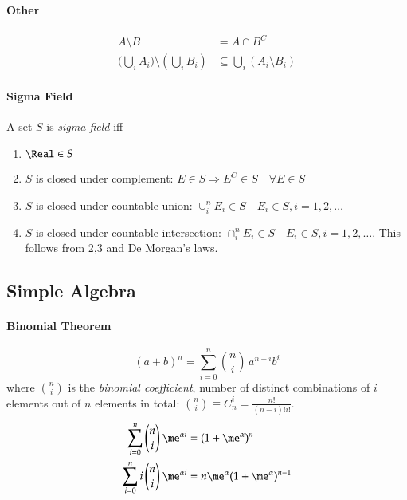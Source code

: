 \documentclass[a4paper]{article}
\numberwithin{equation}{subsection}
\begin{document}
\paragraph{Other}

\begin{align}
  A \setminus B &= A \cap B^C  
\\
  \big(\bigcup_{i} A_{i}\big) \setminus (\bigcup_{i} B_{i}) &\subseteq
                                          \bigcup_{i} (A_{i} \setminus B_{i})
\end{align}

\paragraph{Sigma Field}

A set $S$ is \emph{sigma field} iff
\begin{enumerate}
\item $\Real \in S$
\item $S$ is closed under complement: $E \in S \Rightarrow E^{C} \in S
  \quad \forall E \in S$
\item $S$ is closed under countable union: $\cup_{i}^{n} E_{i} \in S
  \quad E_{i} \in S, i = 1,2,\dots$
\item $S$ is closed under countable intersection: 
  $\cap_{i}^{n} E_{i} \in S \quad E_{i} \in S, i = 1,2,\dots$.  This
  follows from 2,3 and De Morgan's laws.
\end{enumerate}

\subsection{Simple Algebra}

\paragraph{Binomial Theorem}
\begin{equation}
(a+b)^n = \sum^n_{i=0} \binom{n}{i} \, a^{n-i} b^i
\end{equation}
where $\binom{n}{i}$ is the \emph{binomial coefficient}, number of
distinct combinations of $i$ elements out of $n$ elements in total:
$\binom{n}{i} \equiv C_n^i = \frac{n!}{(n-i)! i!}$.
\begin{align}
  \sum_{i=0}^{n} \binom{n}{i}\: \me^{\alpha i}
  &=
  (1 + \me^{\alpha})^{n}
  \\
  \sum_{i=0}^{n} i \, \binom{n}{i}\: \me^{\alpha i}
  &=
  n \me^{\alpha}(1 + \me^{\alpha})^{n-1}
\end{align}
\end{document}
